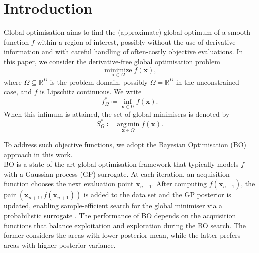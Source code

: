 \documentclass[pdflatex,sn-mathphys-num]{sn-jnl}%
\theoremstyle{thmstyleone}%
\theoremstyle{thmstyletwo}%
\theoremstyle{thmstylethree}%
\begin{document}
\section{Introduction}\label{sec1}

Global optimisation aims to find the (approximate) global optimum of a smooth function $f$ within a region of interest, possibly without the use of derivative information and with careful handling of often-costly objective evaluations. In this paper, we consider the derivative-free global optimisation problem
\begin{equation}\label{main problem}
    \operatorname*{minimize}_{\mathbf{x}\in\Omega} f(\mathbf{x}),
    \tag{P}
\end{equation}
where \(\Omega\subseteq\mathbb R^D\) is the problem domain, possibly \(\Omega=\mathbb R^D\) in the unconstrained case, and $f$ is Lipschitz continuous. We write
\[
    f_\Omega^\ast
    \coloneq
    \inf_{\mathbf x\in\Omega}f(\mathbf x).
\]
When this infimum is attained, the set of global minimisers is denoted by
\[
    S_\Omega^\ast
    \coloneq
    \operatorname*{arg\,min}_{\mathbf x\in\Omega}f(\mathbf x).
\]

To address such objective functions, we adopt the Bayesian Optimisation (BO) approach in this work. \\

BO is a state-of-the-art global optimisation framework that typically models \(f\) with a Gaussian-process (GP) surrogate. At each iteration, an acquisition function chooses the next evaluation point \(\mathbf{x}_{n+1}\). After computing \(f(\mathbf{x}_{n+1})\), the pair \((\mathbf{x}_{n+1}, f(\mathbf{x}_{n+1}))\) is added to the data set and the GP posterior is updated, enabling sample-efficient search for the global minimiser via a probabilistic surrogate \cite{Frazier2018}. The performance of BO depends on the acquisition functions that balance exploitation and exploration during the BO search. The former considers the areas with lower posterior mean, while the latter prefers areas with higher posterior variance.
\end{document}
